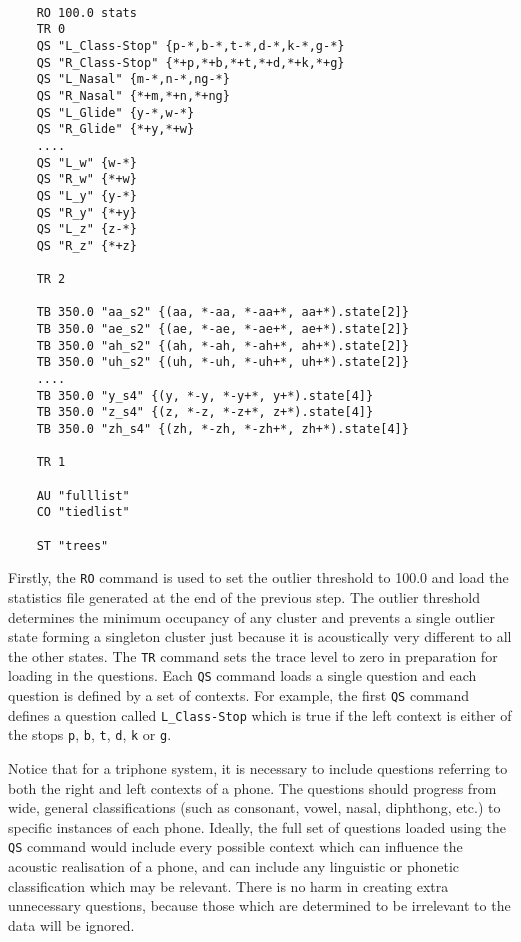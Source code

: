 \begin{verbatim}

    RO 100.0 stats
    TR 0
    QS "L_Class-Stop" {p-*,b-*,t-*,d-*,k-*,g-*} 
    QS "R_Class-Stop" {*+p,*+b,*+t,*+d,*+k,*+g} 
    QS "L_Nasal" {m-*,n-*,ng-*} 
    QS "R_Nasal" {*+m,*+n,*+ng}
    QS "L_Glide" {y-*,w-*} 
    QS "R_Glide" {*+y,*+w}
    ....
    QS "L_w" {w-*} 
    QS "R_w" {*+w} 
    QS "L_y" {y-*} 
    QS "R_y" {*+y} 
    QS "L_z" {z-*} 
    QS "R_z" {*+z} 
 
    TR 2

    TB 350.0 "aa_s2" {(aa, *-aa, *-aa+*, aa+*).state[2]}
    TB 350.0 "ae_s2" {(ae, *-ae, *-ae+*, ae+*).state[2]}
    TB 350.0 "ah_s2" {(ah, *-ah, *-ah+*, ah+*).state[2]}
    TB 350.0 "uh_s2" {(uh, *-uh, *-uh+*, uh+*).state[2]}
    ....
    TB 350.0 "y_s4" {(y, *-y, *-y+*, y+*).state[4]}
    TB 350.0 "z_s4" {(z, *-z, *-z+*, z+*).state[4]}
    TB 350.0 "zh_s4" {(zh, *-zh, *-zh+*, zh+*).state[4]}

    TR 1
    
    AU "fulllist"
    CO "tiedlist"

    ST "trees"
\end{verbatim}
Firstly, the \texttt{RO} command is used to set
the outlier threshold to 100.0 and load the statistics
file generated at the end of the previous step.  The
outlier threshold determines the minimum occupancy of
any cluster and prevents a single outlier state forming a singleton cluster
just because it is acoustically very different to all the other states.  The
\texttt{TR} command sets the trace level to zero
in preparation for loading in the questions.  Each
\texttt{QS} command loads a single question and
each question is defined by a set of contexts.  For example, the first
\texttt{QS} command defines a question called \texttt{L\_Class-Stop} which is
true if the left context is either of the stops \texttt{p},
\texttt{b}, \texttt{t}, \texttt{d}, \texttt{k} or \texttt{g}.

Notice that for a triphone system, it is necessary to include questions
referring to both the right and left contexts of a phone. The questions should
progress from wide, general classifications (such as consonant, vowel, nasal,
diphthong, etc.) to specific instances of each phone.
Ideally, the full set of questions loaded using the \texttt{QS} command would
include every possible context which can influence the acoustic realisation of
a phone, and can include any linguistic or phonetic classification which may be
relevant. There is no harm in creating extra unnecessary questions, because
those which are determined to be irrelevant to the data will be ignored.


